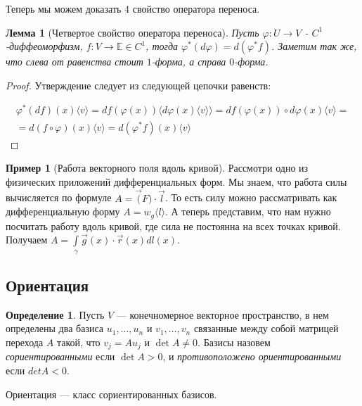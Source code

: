 \documentclass[a5paper]{article}
\newcounter{through}
\theoremstyle{plain}
\newtheorem{lemma}[through]{Лемма}
\theoremstyle{definition}
\newtheorem{definition}[through]{Определение}
\newtheorem{example}[through]{Пример}
\numberwithin{through}{section}
\numberwithin{equation}{section}
\begin{document}
Теперь мы можем доказать 4 свойство оператора переноса.

\begin{lemma}[Четвертое свойство оператора переноса]
	Пусть $\varphi : U \to V$ - $C^1$-диффеоморфизм, $f : V \to \mathbb{E} \in C^1$, тогда $\varphi^{*}(d \varphi) = d (\varphi^{*} f)$. Заметим так же, что слева от равенства стоит $1$-форма, а справа $0$-форма.
\end{lemma}

\begin{proof}
	Утверждение следует из следующей цепочки равенств:
	
	\begin{align*}
		\varphi^{*}(df)(x) \langle v \rangle  = df (\varphi (x)) \langle d\varphi(x) \langle v \rangle \rangle = df (\varphi (x)) \circ d \varphi(x) \langle v \rangle =\\ = d (f \circ \varphi )(x) \langle v \rangle = d(\varphi^{*}f)(x) \langle v \rangle
	\end{align*}
\end{proof}

\begin{example}[Работа векторного поля вдоль кривой]
	Рассмотри одно из физических приложений дифференциальных форм. Мы знаем, что работа силы вычисляется по формуле $A = \vec(F) \cdot \vec{l}$. То есть силу можно рассматривать как дифференциальную форму $A = w_g \langle l \rangle$. А теперь представим, что нам нужно посчитать работу вдоль кривой, где сила не постоянна на всех точках кривой. Получаем $A = \int\limits_{\gamma} \vec{g}(x) \cdot \vec{r}(x) d l(x)$.
\end{example}

\subsection{Ориентация} %

\begin{definition}
	Пусть $V$ --- конечномерное векторное пространство, в нем 
	определены два базиса $u_1,\ldots,u_n$ и $v_1,\ldots,v_n$ связанные
	между собой матрицей перехода $A$ такой, что $v_j = Au_j$ и $\det A \ne 0$.
	Базисы назовем \textit{сориентированными} если $\det A > 0$, и \textit{противоположено ориентированными}
	если $det A < 0$. 
\end{definition}

Ориентация --- класс сориентированных базисов.
\end{document}
